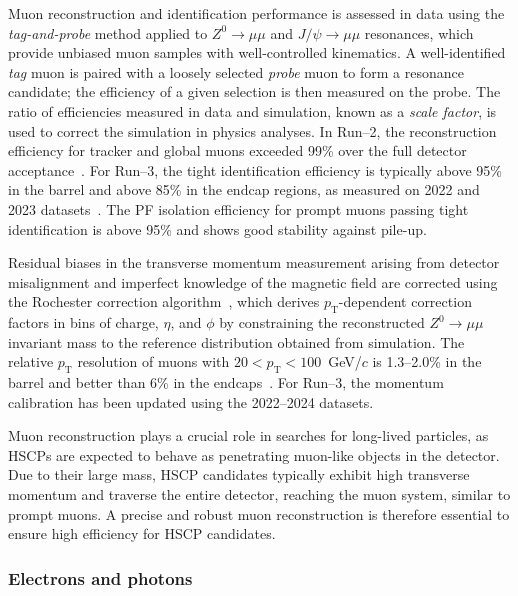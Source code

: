 Muon reconstruction and identification performance is assessed in data using the \textit{tag-and-probe} method applied to $Z^0 \to \mu\mu$ and $J/\psi \to \mu\mu$ resonances, which provide unbiased muon samples with well-controlled kinematics. A well-identified \textit{tag} muon is paired with a loosely selected \textit{probe} muon to form a resonance candidate; the efficiency of a given selection is then measured on the probe. The ratio of efficiencies measured in data and simulation, known as a \textit{scale factor}, is used to correct the simulation in physics analyses. In Run--2, the reconstruction efficiency for tracker and global muons exceeded 99\% over the full detector acceptance~\cite{CMSmuonPerf2018}. For Run--3, the tight identification efficiency is typically above 95\% in the barrel and above 85\% in the endcap regions, as measured on 2022 and 2023 datasets~\cite{CMS-DP-2024-067}. The PF isolation efficiency for prompt muons passing tight identification is above 95\% and shows good stability against pile-up.

  

Residual biases in the transverse momentum measurement arising from detector misalignment and imperfect knowledge of the magnetic field are corrected using the Rochester correction algorithm~\cite{RochesterAlgorithm}, which derives $p_{\mathrm{T}}$-dependent correction factors in bins of charge, $\eta$, and $\phi$ by constraining the reconstructed $Z^0 \to \mu\mu$ invariant mass to the reference distribution obtained from simulation. The relative $p_{\mathrm{T}}$ resolution of muons with $20 < p_{\mathrm{T}} < 100$~GeV/$c$ is 1.3--2.0\% in the barrel and better than 6\% in the endcaps~\cite{CMSmuonPerf2012}. For Run--3, the momentum calibration has been updated using the 2022--2024 datasets.

\vspace{0.5 cm}

Muon reconstruction plays a crucial role in searches for long-lived particles, as HSCPs are expected to behave as penetrating muon-like objects in the detector. Due to their large mass, HSCP candidates typically exhibit high transverse momentum and traverse the entire detector, reaching the muon system, similar to prompt muons. A precise and robust muon reconstruction is therefore essential to ensure high efficiency for HSCP candidates.


\subsubsection{Electrons and photons}

